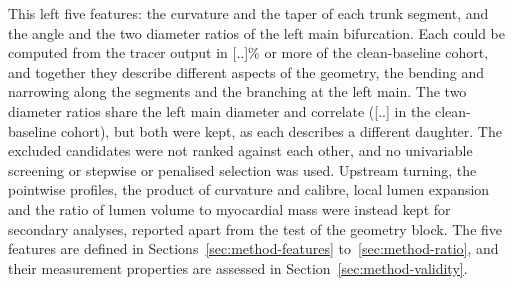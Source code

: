 This left five features: the curvature and the taper of each trunk segment, and the angle and the two diameter ratios of the left main bifurcation.
Each could be computed from the tracer output in [..]\% or more of the clean-baseline cohort, and together they describe different aspects of the geometry, the bending and narrowing along the segments and the branching at the left main.
The two diameter ratios share the left main diameter and correlate ([..] in the clean-baseline cohort), but both were kept, as each describes a different daughter.
The excluded candidates were not ranked against each other, and no univariable screening or stepwise or penalised selection was used.
Upstream turning, the pointwise profiles, the product of curvature and calibre, local lumen expansion and the ratio of lumen volume to myocardial mass were instead kept for secondary analyses, reported apart from the test of the geometry block.
The five features are defined in Sections~\ref{sec:method-features} to~\ref{sec:method-ratio}, and their measurement properties are assessed in Section~\ref{sec:method-validity}.
